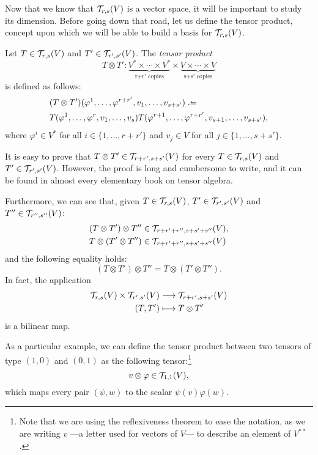 Now that we know that ${\mathcal T}_{r,s}(V)$ is a vector space, it will be important to study its dimension. Before going down that road, let us define the tensor product, concept upon which we will be able to build a basis for ${\mathcal T}_{r,s}(V)$.

\begin{definition}
	Let $T \in {\mathcal T}_{r,s}(V)$ and $T' \in {\mathcal T}_{r',s'}(V)$. The \emph{tensor product} \[T \otimes T' \colon \underbrace{V^* \times \cdots \times V^*}_{\text{r+r' copies}} \times \underbrace{V \times \cdots \times V}_{\text{s+s' copies}}\] is defined as follows:
	\begin{align*}
		&(T \otimes T')(\varphi^1, \dots, \varphi^{r+r'}, v_1, \dots, v_{s+s'}) \defeq \\
		&T(\varphi^1, \dots, \varphi^r, v_1, \dots, v_s) T(\varphi^{r+1}, \dots, \varphi^{r+r'}, v_{s+1}, \dots, v_{s+s'}),
	\end{align*}
	where $\varphi^i \in V^*$ for all $i \in \{1,\dots,r+r'\}$ and $v_j \in V$ for all $j \in \{1,\dots,s+s'\}$.
\end{definition}

It is easy to prove that $T \otimes T' \in {\mathcal T}_{r+r',s+s'}(V)$ for every $T \in {\mathcal T}_{r,s}(V)$ and $T' \in {\mathcal T}_{r',s'}(V)$. However, the proof is long and cumbersome to write, and it can be found in almost every elementary book on tensor algebra.

Furthermore, we can see that, given $T \in {\mathcal T}_{r,s}(V)$, $T' \in {\mathcal T}_{r',s'}(V)$ and $T'' \in {\mathcal T}_{r'',s''}(V)$:
\begin{align*}
	(T \otimes T') \otimes T'' &\in {\mathcal T}_{r+r'+r'', s+s'+s''}(V),\\
	T \otimes (T' \otimes T'') &\in {\mathcal T}_{r+r'+r'', s+s'+s''}(V)
\end{align*}
and the following equality holds:
\[
	(T \otimes T') \otimes T'' = T \otimes (T' \otimes T'').
\]
In fact, the application
\begin{align*}
	{\mathcal T}_{r,s}(V) \times {\mathcal T}_{r',s'}(V) &\longrightarrow {\mathcal T}_{r+r',s+s'}(V) \\
	(T,T') &\longmapsto T \otimes T'
\end{align*}
is a bilinear map.

As a particular example, we can define the tensor product between two tensors of type $(1,0)$ and $(0,1)$ as the following tensor:\footnote{Note that we are using the reflexiveness theorem to ease the notation, as we are writing $v$ ---a letter used for vectors of $V$--- to describe an element of $V^{**}$.}
\[
	v \otimes \varphi \in {\mathcal T}_{1,1}(V),
\]
which maps every pair $(\psi, w)$ to the scalar $\psi(v)\varphi(w)$.

